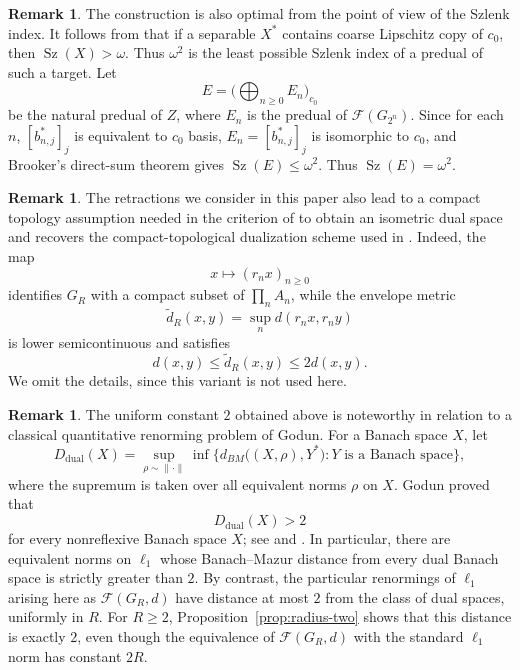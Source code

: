\documentclass[11pt]{amsart}
\theoremstyle{definition}
\newtheorem{remark}[theorem]{Remark}
\newcommand{\F}{\mathcal F}
\begin{document}
\begin{remark}\label{cor:optimal-szlenk}The construction is also optimal from the point of view of the Szlenk index. It follows from \cite[Theorem 4.3]{BLPP} that if a separable $X^*$ contains coarse Lipschitz copy of $c_0$, then $\operatorname{Sz}(X)>\omega.$ Thus $\omega^2$ is the least possible Szlenk index of a predual of such a target.
Let \[ E= \Big( \bigoplus_{n\geq0}E_n \Big)_{c_0} \] be the natural predual of $Z$, where $E_n$ is the predual of $\F(G_{2^n})$. Since for each $n$, $[b^*_{n,j}]_j$ is equivalent to $c_0$ basis, $E_n=[b^*_{n,j}]_j$ is isomorphic to $c_0$, and Brooker's direct-sum theorem \cite{Brooker} gives $\operatorname{Sz}(E)\leq\omega^2.$ Thus $\operatorname{Sz}(E)=\omega^2.$
\end{remark}

 
\begin{remark}\label{rem:compact-variant}
The retractions we consider in this paper also lead to a compact topology assumption needed in the criterion of \cite{GLPPRZ} to obtain an isometric dual space and recovers the compact-topological dualization scheme used in \cite{BLPP}.  Indeed, the map
$$
x\longmapsto(r_nx)_{n\geq0}
$$
identifies $G_R$ with a compact subset of $\prod_n A_n$, while the envelope
metric
$$
\widetilde d_R(x,y)=\sup_n d(r_nx,r_ny)
$$
is lower semicontinuous and satisfies
$$
d(x,y)\leq\widetilde d_R(x,y)\leq2d(x,y).
$$
We omit the details, since this variant is not used here.
\end{remark}

\begin{remark}\label{rem:godun-dual-distance}
The uniform constant $2$ obtained above is noteworthy in relation to a
classical quantitative renorming problem of Godun.  For a Banach space
$X$, let
$$
D_{\mathrm{dual}}(X)
=\sup_{\rho\sim\|\cdot\|}
\inf\bigl\{
d_{BM}\bigl((X,\rho),Y^*\bigr):
Y\text{ is a Banach space}
\bigr\},
$$
where the supremum is taken over all equivalent norms $\rho$ on $X$.
Godun proved that
$$
D_{\mathrm{dual}}(X)>2
$$
for every nonreflexive Banach space $X$; see \cite{Godun} and
\cite{S}.  In particular,
there are equivalent norms on $\ell_1$ whose Banach--Mazur distance from
every dual Banach space is strictly greater than $2$.  By contrast, the
particular renormings of $\ell_1$ arising here as $\F(G_R,d)$ have
distance at most $2$ from the class of dual spaces, uniformly in $R$.
For $R\geq2$, Proposition~\ref{prop:radius-two} shows that this distance
is exactly $2$, even though the equivalence of
$\F(G_R,d)$ with the standard $\ell_1$ norm has constant $2R$.

\end{remark}
\end{document}
